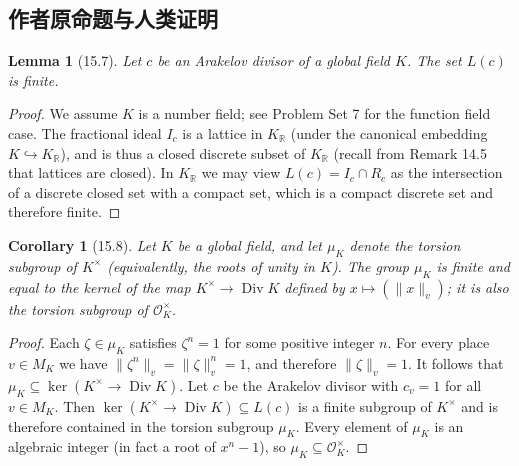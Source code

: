 \documentclass[UTF8,11pt]{ctexart}
\newtheorem*{lemma}{Lemma}
\newtheorem*{corollary}{Corollary}
\begin{document}
\subsection*{作者原命题与人类证明}
\begin{lemma}[15.7]
Let $c$ be an Arakelov divisor of a global field $K$. The set $L(c)$ is finite.
\end{lemma}
\begin{proof}
We assume $K$ is a number field; see Problem Set 7 for the function field case. The fractional ideal $I_c$ is a lattice in $K_{\mathbb R}$ (under the canonical embedding $K\hookrightarrow K_{\mathbb R}$), and is thus a closed discrete subset of $K_{\mathbb R}$ (recall from Remark 14.5 that lattices are closed). In $K_{\mathbb R}$ we may view $L(c)=I_c\cap R_c$ as the intersection of a discrete closed set with a compact set, which is a compact discrete set and therefore finite.
\end{proof}
\begin{corollary}[15.8]
Let $K$ be a global field, and let $\mu_K$ denote the torsion subgroup of $K^\times$ (equivalently, the roots of unity in $K$). The group $\mu_K$ is finite and equal to the kernel of the map $K^\times\to\operatorname{Div}K$ defined by $x\mapsto(\|x\|_v)$; it is also the torsion subgroup of $\mathcal O_K^\times$.
\end{corollary}
\begin{proof}
Each $\zeta\in\mu_K$ satisfies $\zeta^n=1$ for some positive integer $n$. For every place $v\in M_K$ we have $\|\zeta^n\|_v=\|\zeta\|_v^n=1$, and therefore $\|\zeta\|_v=1$. It follows that $\mu_K\subseteq\ker(K^\times\to\operatorname{Div}K)$. Let $c$ be the Arakelov divisor with $c_v=1$ for all $v\in M_K$. Then $\ker(K^\times\to\operatorname{Div}K)\subseteq L(c)$ is a finite subgroup of $K^\times$ and is therefore contained in the torsion subgroup $\mu_K$. Every element of $\mu_K$ is an algebraic integer (in fact a root of $x^n-1$), so $\mu_K\subseteq\mathcal O_K^\times$.
\end{proof}
\end{document}
